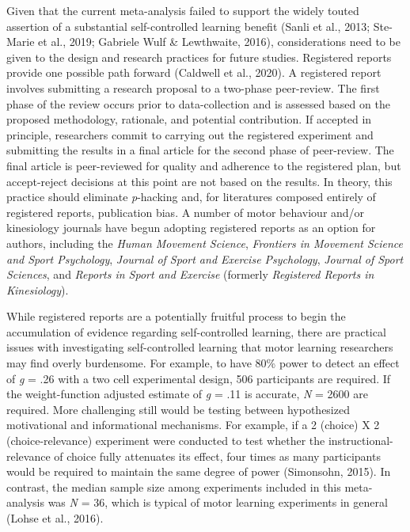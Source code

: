 \documentclass[
  english,
  man, donotrepeattitle,floatsintext]{apa7}
\begin{document}
Given that the current meta-analysis failed to support the widely touted assertion of a substantial self-controlled learning benefit (Sanli et al., 2013; Ste-Marie et al., 2019; Gabriele Wulf \& Lewthwaite, 2016), considerations need to be given to the design and research practices for future studies. Registered reports provide one possible path forward (Caldwell et al., 2020). A registered report involves submitting a research proposal to a two-phase peer-review. The first phase of the review occurs prior to data-collection and is assessed based on the proposed methodology, rationale, and potential contribution. If accepted in principle, researchers commit to carrying out the registered experiment and submitting the results in a final article for the second phase of peer-review. The final article is peer-reviewed for quality and adherence to the registered plan, but accept-reject decisions at this point are not based on the results. In theory, this practice should eliminate \emph{p}-hacking and, for literatures composed entirely of registered reports, publication bias. A number of motor behaviour and/or kinesiology journals have begun adopting registered reports as an option for authors, including the \emph{Human Movement Science}, \emph{Frontiers in Movement Science and Sport Psychology}, \emph{Journal of Sport and Exercise Psychology}, \emph{Journal of Sport Sciences}, and \emph{Reports in Sport and Exercise} (formerly \emph{Registered Reports in Kinesiology}).

While registered reports are a potentially fruitful process to begin the accumulation of evidence regarding self-controlled learning, there are practical issues with investigating self-controlled learning that motor learning researchers may find overly burdensome. For example, to have 80\% power to detect an effect of \emph{g} = .26 with a two cell experimental design, 506 participants are required. If the weight-function adjusted estimate of \emph{g} = .11 is accurate, \emph{N} = 2600 are required. More challenging still would be testing between hypothesized motivational and informational mechanisms. For example, if a 2 (choice) X 2 (choice-relevance) experiment were conducted to test whether the instructional-relevance of choice fully attenuates its effect, four times as many participants would be required to maintain the same degree of power (Simonsohn, 2015). In contrast, the median sample size among experiments included in this meta-analysis was \emph{N} = 36, which is typical of motor learning experiments in general (Lohse et al., 2016).
\end{document}
